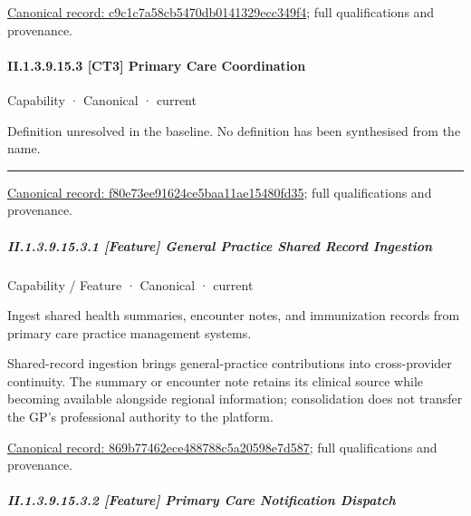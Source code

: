{\footnotesize \href{../../../../../../../continuum/strategy/capability/feature/c9c1c7a58cb5470db0141329ecc349f4.md}{Canonical record: c9c1c7a58cb5470db0141329ecc349f4}; full qualifications and provenance.}\par
\paragraph*{II.1.3.9.15.3 [CT3] Primary Care Coordination}
\label{navigation:II.1.3.9.15.3}

\label{element:f80e73ee91624ce5baa11ae15480fd35}
{\small Capability · Canonical · current}\par

Definition unresolved in the baseline. No definition has been synthesised from the name.



\medskip\hrule\medskip

{\footnotesize \href{../../../../../../../continuum/strategy/capability/f80e73ee91624ce5baa11ae15480fd35.md}{Canonical record: f80e73ee91624ce5baa11ae15480fd35}; full qualifications and provenance.}\par
\subparagraph*{II.1.3.9.15.3.1 [Feature] General Practice Shared Record Ingestion}
\label{navigation:II.1.3.9.15.3.1}

\label{element:869b77462ece488788c5a20598e7d587}
{\small Capability / Feature · Canonical · current}\par

Ingest shared health summaries, encounter notes, and immunization records from primary care practice management systems.



Shared-record ingestion brings general-practice contributions into cross-provider continuity. The summary or encounter note retains its clinical source while becoming available alongside regional information; consolidation does not transfer the GP's professional authority to the platform.


{\footnotesize \href{../../../../../../../continuum/strategy/capability/feature/869b77462ece488788c5a20598e7d587.md}{Canonical record: 869b77462ece488788c5a20598e7d587}; full qualifications and provenance.}\par
\subparagraph*{II.1.3.9.15.3.2 [Feature] Primary Care Notification Dispatch}
\label{navigation:II.1.3.9.15.3.2}


